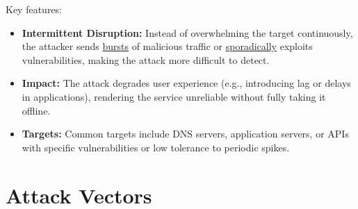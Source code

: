 Key features:
\begin{itemize}
    \item \textbf{Intermittent Disruption:} Instead of overwhelming the target continuously, the attacker sends \underline{bursts} of malicious traffic or \underline{sporadically} exploits vulnerabilities, making the attack more difficult to detect.
    \item \textbf{Impact:} The attack degrades user experience (e.g., introducing lag or delays in applications), rendering the service unreliable without fully taking it offline.
    \item \textbf{Targets:} Common targets include DNS servers, application servers, or APIs with specific vulnerabilities or low tolerance to periodic spikes.
\end{itemize}












\section{Attack Vectors}

